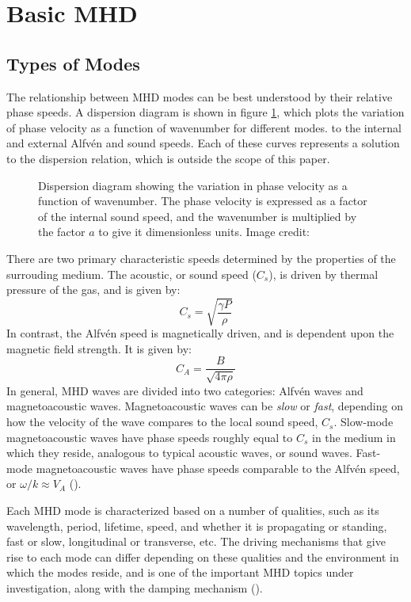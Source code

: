 \documentclass[preprint2]{aastex}
\begin{document}
\section{Basic MHD}\label{MHD}
\subsection{Types of Modes}
The relationship between MHD modes can be best understood
by their relative phase speeds. A dispersion diagram is shown in
figure {\ref{speeds}}, which plots the variation of phase velocity as a
function of wavenumber for different modes.
to the internal and external Alfv\'en and sound speeds.
Each of these curves represents a solution to the dispersion relation,
which is outside the scope of this paper.
\begin{figure}[!htb]
    \caption{Dispersion diagram showing the variation in phase velocity
        as a function of wavenumber. The phase velocity is expressed as a
        factor of the internal sound speed, and the wavenumber is
        multiplied by the factor $a$ to give it dimensionless units.
        Image credit:~\cite{Nak}}
    \label{speeds}
\end{figure}
There are two primary characteristic speeds determined by the properties
of the surrouding medium.
The acoustic, or sound speed ($C_{s}$), is driven by thermal pressure of
the gas, and is given by:
\begin{equation}\label{sound_speed}
    C_s = \sqrt{\frac{\gamma{P}}{\rho}}
\end{equation}
In contrast, the Alfv\'en speed is magnetically driven, and is
dependent upon the magnetic field strength.
It is given by:
\begin{equation}\label{Alfven_speed}
    C_A = \frac{B}{\sqrt{4\pi\rho}}
\end{equation}
In general, MHD waves are divided into two categories:
Alfv\'en waves and magnetoacoustic waves.
Magnetoacoustic waves can be \emph{slow} or \emph{fast}, depending on
how the velocity of the wave compares to the local sound speed,
$C_{s}$.
Slow-mode magnetoacoustic waves have phase speeds roughly equal to $C_{s}$
in the medium in which they reside, analogous to typical acoustic waves,
or sound waves.
Fast-mode magnetoacoustic waves have phase speeds comparable to the Alfv\'en
speed, or $\omega/k \approx V_A$ (\cite{kink_1}).

Each MHD mode is characterized based on a number of qualities, such
as its wavelength, period, lifetime, speed, and
whether it is propagating or standing, fast or slow, longitudinal
or transverse, etc. The driving mechanisms that give rise to each mode
can differ depending on these qualities and the environment in which
the modes reside, and is one of the important MHD topics under investigation,
along with the damping mechanism (\cite{kink_1}).
\end{document}
